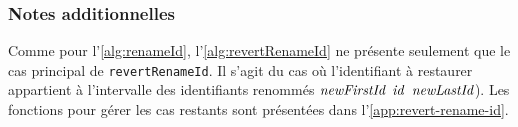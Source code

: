 



\subsubsection{Notes additionnelles}

Comme pour l'\autoref{alg:renameId}, l'\autoref{alg:revertRenameId} ne présente seulement que le cas principal de \texttt{revertRenameId}.
Il s'agit du cas où l'identifiant à restaurer appartient à l'intervalle des identifiants renommés $\mathit{newFirstId}$ \leqid $\mathit{id}$ \leqid $\mathit{newLastId}$).
Les fonctions pour gérer les cas restants sont présentées dans l'\autoref{app:revert-rename-id}.\\

